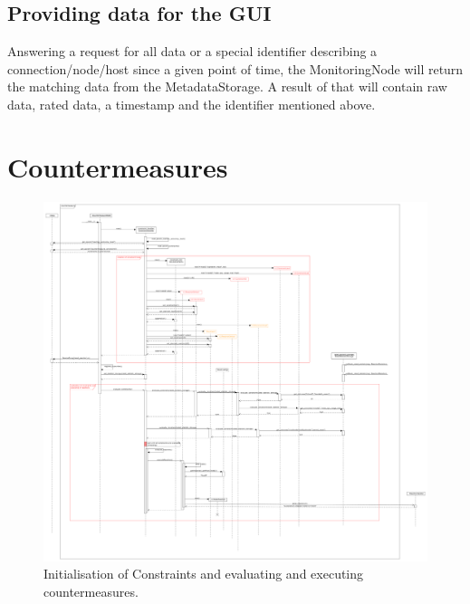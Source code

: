 \subsection*{Providing data for the GUI}
Answering a request for all data or a special identifier describing a connection/node/host since a given point of time, the MonitoringNode will return the matching data from the MetadataStorage.
A result of that will contain raw data, rated data, a timestamp and the identifier mentioned above.
 
\newpage 
\section{Countermeasures} 
\begin{figure}[!ht] 
	\begin{center} 
		\includegraphics[width=1.0\linewidth]{./diagram_pictures/reactor/reactor_seq.pdf} 
		\caption{Initialisation of Constraints and evaluating and executing countermeasures.} 
	\end{center} 
\end{figure}

\newpage
